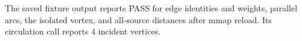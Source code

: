 The saved fixture output reports PASS for edge identities and weights, parallel arcs, the isolated vertex, and all-source distances after mmap reload. Its circulation call reports 4 incident vertices.
